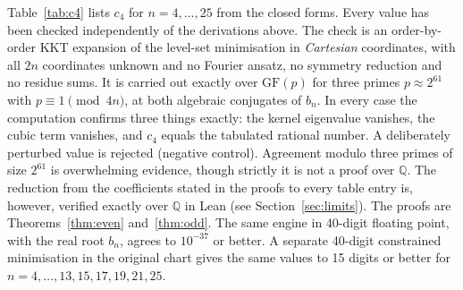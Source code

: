 \documentclass[11pt]{article}
\theoremstyle{definition}
\theoremstyle{remark}
\begin{document}
Table~\ref{tab:c4} lists $c_4$ for $n=4,\dots,25$ from the closed forms. Every value has been checked
independently of the derivations above. The check is an order-by-order KKT expansion of the level-set
minimisation in \emph{Cartesian} coordinates, with all $2n$ coordinates unknown and no Fourier ansatz, no
symmetry reduction and no residue sums. It is carried out exactly over $\mathrm{GF}(p)$ for three primes
$p\approx2^{61}$ with $p\equiv1\pmod{4n}$, at both algebraic conjugates of $b_n$. In every case the
computation confirms three things exactly: the kernel eigenvalue vanishes, the cubic term vanishes, and
$c_4$ equals the tabulated rational number. A deliberately perturbed value is rejected (negative control).
Agreement modulo three primes of size $2^{61}$ is overwhelming evidence, though strictly it is not a proof
over $\mathbb Q$. The reduction from the coefficients stated in the proofs to every table entry is, however, verified
exactly over $\mathbb Q$ in Lean (see Section~\ref{sec:limits}). The proofs are Theorems~\ref{thm:even} and~\ref{thm:odd}. The same engine in 40-digit
floating point, with the real root $b_n$, agrees to $10^{-37}$ or better. A separate 40-digit constrained
minimisation in the original chart gives the same values to 15 digits or better for
$n=4,\dots,13,15,17,19,21,25$.
\end{document}

